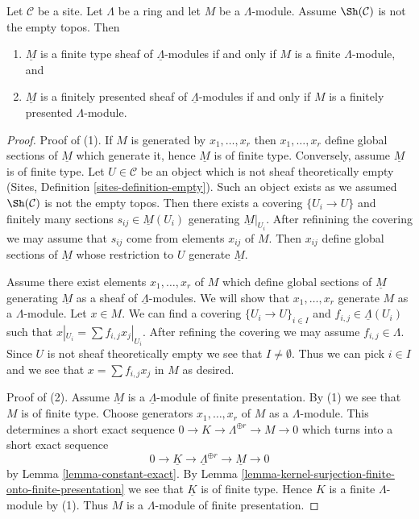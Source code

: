 \begin{lemma}
\label{lemma-locally-constant-finite-type}
Let $\mathcal{C}$ be a site. Let $\Lambda$ be a ring and let $M$ be a
$\Lambda$-module. Assume $\Sh(\mathcal{C})$ is not the empty topos. Then
\begin{enumerate}
\item $\underline{M}$ is a finite type sheaf of $\underline{\Lambda}$-modules
if and only if $M$ is a finite $\Lambda$-module, and
\item $\underline{M}$ is a finitely presented sheaf of
$\underline{\Lambda}$-modules if and only if $M$ is a 
finitely presented $\Lambda$-module.
\end{enumerate}
\end{lemma}

\begin{proof}
Proof of (1). If $M$ is generated by $x_1, \ldots, x_r$ then
$x_1, \ldots, x_r$ define global sections of $\underline{M}$ which
generate it, hence $\underline{M}$ is of finite type. Conversely, assume
$\underline{M}$ is of finite type. Let $U \in \mathcal{C}$ be an object
which is not sheaf theoretically empty
(Sites, Definition \ref{sites-definition-empty}).
Such an object exists as we assumed $\Sh(\mathcal{C})$ is not
the empty topos. Then there exists a covering $\{U_i \to U\}$
and finitely many sections $s_{ij} \in \underline{M}(U_i)$ generating
$\underline{M}|_{U_i}$. After refinining the covering we may assume
that $s_{ij}$ come from elements $x_{ij}$ of $M$. Then
$x_{ij}$ define global sections of $\underline{M}$ whose restriction
to $U$ generate $\underline{M}$.

\medskip\noindent
Assume there exist elements $x_1, \ldots, x_r$ of $M$ which define
global sections of $\underline{M}$ generating $\underline{M}$
as a sheaf of $\underline{\Lambda}$-modules. We will show that
$x_1, \ldots, x_r$ generate $M$ as a $\Lambda$-module.
Let $x \in M$. We can find a covering $\{U_i \to U\}_{i \in I}$
and $f_{i, j} \in \underline{\Lambda}(U_i)$ such that
$x|_{U_i} = \sum f_{i, j} x_j|_{U_i}$. After refining the covering
we may assume $f_{i, j} \in \Lambda$. Since $U$ is not
sheaf theoretically empty we see that $I \not = \emptyset$.
Thus we can pick $i \in I$ and we see that $x = \sum f_{i, j}x_j$
in $M$ as desired.

\medskip\noindent
Proof of (2). Assume $\underline{M}$ is a $\underline{\Lambda}$-module
of finite presentation. By (1) we see that $M$ is of finite type.
Choose generators $x_1, \ldots, x_r$ of $M$ as a $\Lambda$-module.
This determines a short exact sequence
$0 \to K \to \Lambda^{\oplus r} \to M \to 0$ which
turns into a short exact sequence
$$
0 \to \underline{K} \to \underline{\Lambda}^{\oplus r} \to \underline{M} \to 0
$$
by Lemma \ref{lemma-constant-exact}. By
Lemma \ref{lemma-kernel-surjection-finite-onto-finite-presentation}
we see that $\underline{K}$ is of finite type. Hence $K$ is a
finite $\Lambda$-module by (1). Thus $M$ is a $\Lambda$-module
of finite presentation.
\end{proof}




